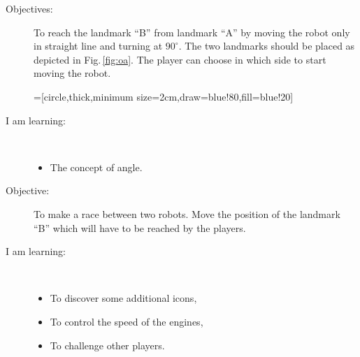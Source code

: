 \begin{flushleft}
\begin{description}
\item[Objectives:] To reach the landmark ``B'' from landmark ``A'' by moving the robot only in straight line and turning at $90^{\circ}$. The two landmarks should be placed as depicted in Fig.\,\ref{fig:oa}. The player can choose in which side to start moving the robot. 
\begin{minipage}[c]{\textwidth}
\centering
{}=[circle,thick,minimum size=2cm,draw=blue!80,fill=blue!20]
\vspace{1ex}
\label{fig:oa}
\end{minipage}
\item[I am learning:] \hfill \\ \vspace{-1ex}
  \begin{itemize}
  \item The concept of angle.
  \end{itemize}
\end{description}
\end{flushleft}
\frameboxend

\begin{flushleft}
\begin{description}
\item[Objective:] To make a race between two robots. Move the position of the landmark ``B'' which will have to be reached by the players.
\item[I am learning:] \hfill \\ \vspace{-1ex}
  \begin{itemize}
  \item To discover some additional icons,
  \item To control the speed of the engines,
  \item To challenge other players.
  \end{itemize}
\end{description}
\end{flushleft}
\frameboxend

